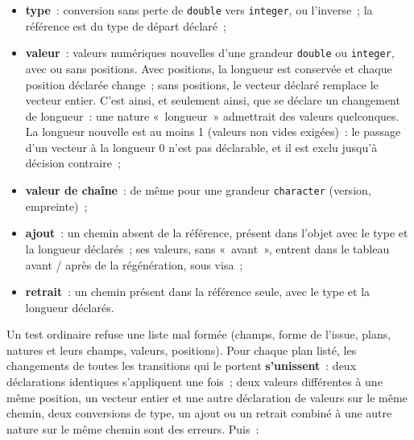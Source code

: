 \documentclass[a4paper,11pt]{article}
\newcommand{\code}[1]{\texttt{\small #1}}
\begin{document}
\begin{itemize}[leftmargin=*, itemsep=2pt]
  \item \textbf{type}~: conversion sans perte de \code{double} vers
    \code{integer}, ou l'inverse~; la référence est du type de départ
    déclaré~;
  \item \textbf{valeur}~: valeurs numériques nouvelles d'une grandeur
    \code{double} ou \code{integer}, avec ou sans positions. Avec positions,
    la longueur est conservée et chaque position déclarée change~; sans
    positions, le vecteur déclaré remplace le vecteur entier. C'est ainsi, et
    seulement ainsi, que se déclare un changement de longueur~: une nature
    «~longueur~» admettrait des valeurs quelconques. La longueur nouvelle est
    au moins 1 (valeurs non vides exigées)~: le passage d'un vecteur à la
    longueur 0 n'est pas déclarable, et il est exclu jusqu'à décision
    contraire~;
  \item \textbf{valeur de chaîne}~: de même pour une grandeur
    \code{character} (version, empreinte)~;
  \item \textbf{ajout}~: un chemin absent de la référence, présent dans
    l'objet avec le type et la longueur déclarés~; ses valeurs, sans
    «~avant~», entrent dans le tableau avant / après de la régénération, sous
    visa~;
  \item \textbf{retrait}~: un chemin présent dans la référence seule, avec
    le type et la longueur déclarés.
\end{itemize}

\noindent
Un test ordinaire refuse une liste mal formée (champs, forme de l'issue,
plans, natures et leurs champs, valeurs, positions). Pour chaque plan
listé, les changements de toutes les transitions qui le portent
\textbf{s'unissent}~: deux déclarations identiques s'appliquent une fois~;
deux valeurs différentes à une même position, un vecteur entier et une autre
déclaration de valeurs sur le même chemin, deux conversions de type, un ajout
ou un retrait combiné à une autre nature sur le même chemin sont des
erreurs. Puis~:
\end{document}
